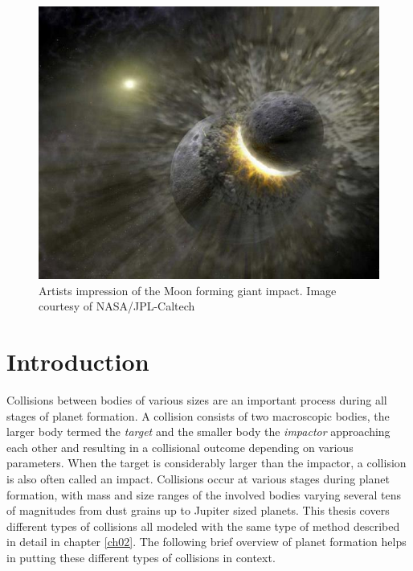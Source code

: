 
\begin{figure}
\begin{center}
\includegraphics[scale=0.6]{01figs/01planet-collision.jpg}
\caption{Artists impression of the Moon forming giant impact. Image courtesy of NASA/JPL-Caltech}
\label{ch01_fig01}
\end{center}
\end{figure}


\chapter{Introduction}
\label{ch01}
\graphicspath{{./01figs/}}
Collisions between bodies of various sizes are an important process during all stages of planet formation. A collision consists of two macroscopic bodies, the larger body termed the \emph{target} and the smaller body the \emph{impactor} approaching each other and resulting in a collisional outcome depending on various parameters. When the target is considerably larger than the impactor, a collision is also often called an impact. Collisions occur at various stages during planet formation, with mass and size ranges of the involved bodies varying several tens of magnitudes from dust grains up to Jupiter sized planets. This thesis covers different types of collisions all modeled with the same type of method described in detail in chapter \ref{ch02}. The following brief overview of planet formation helps in putting these different types of collisions in context.

